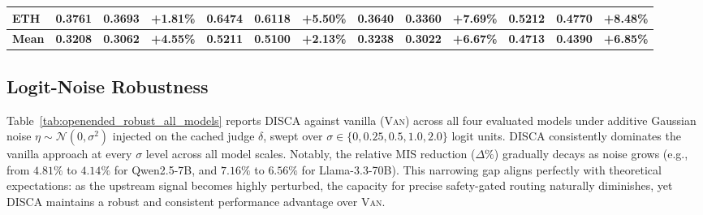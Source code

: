 \documentclass{article}
\providecommand{\gain}{}\renewcommand{\gain}[1]{\textcolor{improvegreen}{#1}}
\begin{document}
\begin{table}[H]
{\begin{tabular}{l ccc ccc ccc ccc}
ETH & 0.3761 & \textbf{0.3693} & \gain{+1.81\%} & 0.6474 & \textbf{0.6118} & \gain{\textbf{+5.50\%}} & 0.3640 & \textbf{0.3360} & \gain{+7.69\%} & 0.5212 & \textbf{0.4770} & \gain{+8.48\%} \\
\midrule
\textbf{Mean} & \textbf{0.3208} & \textbf{0.3062} & \gain{\textbf{+4.55\%}} & \textbf{0.5211} & \textbf{0.5100} & \gain{\textbf{+2.13\%}} & \textbf{0.3238} & \textbf{0.3022} & \gain{\textbf{+6.67\%}} & \textbf{0.4713} & \textbf{0.4390} & \gain{\textbf{+6.85\%}} \\
\bottomrule
\end{tabular}
\vspace{2pt}
}
\end{table}

\subsection{Logit-Noise Robustness}
\label{app:openended_robustness}

Table~\ref{tab:openended_robust_all_models} reports DISCA against vanilla (\textsc{Van}) across all four evaluated models under additive Gaussian noise $\eta\!\sim\!\mathcal{N}(0,\sigma^2)$ injected on the cached judge $\delta$, swept over $\sigma\in\{0, 0.25, 0.5, 1.0, 2.0\}$ logit units. DISCA consistently dominates the vanilla approach at every $\sigma$ level across all model scales. Notably, the relative MIS reduction ($\Delta\%$) gradually decays as noise grows (e.g., from $4.81\%$ to $4.14\%$ for Qwen2.5-7B, and $7.16\%$ to $6.56\%$ for Llama-3.3-70B). This narrowing gap aligns perfectly with theoretical expectations: as the upstream signal becomes highly perturbed, the capacity for precise safety-gated routing naturally diminishes, yet DISCA maintains a robust and consistent performance advantage over \textsc{Van}.
\end{document}
